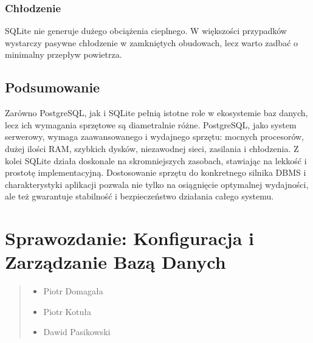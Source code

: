 \documentclass[letterpaper,10pt,polish]{sphinxmanual}
\begin{document}
\subsubsection{Chłodzenie}
\label{\detokenize{rozdzial2/Sprzet-dla-bazy-danych/source/SprzetDlaBazyDanych:id6}}
\sphinxAtStartPar
SQLite nie generuje dużego obciążenia cieplnego. W większości przypadków wystarczy pasywne chłodzenie w zamkniętych obudowach, lecz warto zadbać o minimalny przepływ powietrza.


\subsection{Podsumowanie}
\label{\detokenize{rozdzial2/Sprzet-dla-bazy-danych/source/SprzetDlaBazyDanych:podsumowanie}}
\sphinxAtStartPar
Zarówno PostgreSQL, jak i SQLite pełnią istotne role w ekosystemie baz danych, lecz ich wymagania sprzętowe są diametralnie różne. PostgreSQL, jako system serwerowy, wymaga zaawansowanego i wydajnego sprzętu: mocnych procesorów, dużej ilości RAM, szybkich dysków, niezawodnej sieci, zasilania i chłodzenia.
Z kolei SQLite działa doskonale na skromniejszych zasobach, stawiając na lekkość i prostotę implementacyjną.
Dostosowanie sprzętu do konkretnego silnika DBMS i charakterystyki aplikacji pozwala nie tylko na osiągnięcie optymalnej wydajności, ale też gwarantuje stabilność i bezpieczeństwo działania całego systemu.

\sphinxstepscope


\section{Sprawozdanie: Konfiguracja i Zarządzanie Bazą Danych}
\label{\detokenize{rozdzial2/Konfiguracja_baz_danych/Konfiguracja_baz_danych:sprawozdanie-konfiguracja-i-zarzadzanie-baza-danych}}\label{\detokenize{rozdzial2/Konfiguracja_baz_danych/Konfiguracja_baz_danych::doc}}\begin{quote}\begin{description}
\begin{itemize}
\item {} 
\sphinxAtStartPar
Piotr Domagała

\item {} 
\sphinxAtStartPar
Piotr Kotuła

\item {} 
\sphinxAtStartPar
Dawid Pasikowski

\end{itemize}

\end{description}\end{quote}
\end{document}
